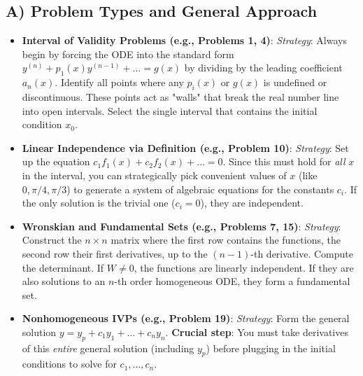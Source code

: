 \documentclass[11pt,letterpaper]{article}
\begin{document}
\subsection{A) Problem Types and General Approach}
\begin{itemize}
    \item \textbf{Interval of Validity Problems (e.g., Problems 1, 4)}: 
    \textit{Strategy}: Always begin by forcing the ODE into the standard form $y^{(n)} + p_1(x)y^{(n-1)} + \dots = g(x)$ by dividing by the leading coefficient $a_n(x)$. Identify all points where any $p_i(x)$ or $g(x)$ is undefined or discontinuous. These points act as "walls" that break the real number line into open intervals. Select the single interval that contains the initial condition $x_0$.
    
    \item \textbf{Linear Independence via Definition (e.g., Problem 10)}: 
    \textit{Strategy}: Set up the equation $c_1 f_1(x) + c_2 f_2(x) + \dots = 0$. Since this must hold for \textit{all} $x$ in the interval, you can strategically pick convenient values of $x$ (like $0, \pi/4, \pi/3$) to generate a system of algebraic equations for the constants $c_i$. If the only solution is the trivial one ($c_i = 0$), they are independent.
    
    \item \textbf{Wronskian and Fundamental Sets (e.g., Problems 7, 15)}: 
    \textit{Strategy}: Construct the $n \times n$ matrix where the first row contains the functions, the second row their first derivatives, up to the $(n-1)$-th derivative. Compute the determinant. If $W \neq 0$, the functions are linearly independent. If they are also solutions to an $n$-th order homogeneous ODE, they form a fundamental set.
    
    \item \textbf{Nonhomogeneous IVPs (e.g., Problem 19)}: 
    \textit{Strategy}: Form the general solution $y = y_p + c_1 y_1 + \dots + c_n y_n$. \textbf{Crucial step}: You must take derivatives of this \textit{entire} general solution (including $y_p$) before plugging in the initial conditions to solve for $c_1, \dots, c_n$.
\end{itemize}
\end{document}
